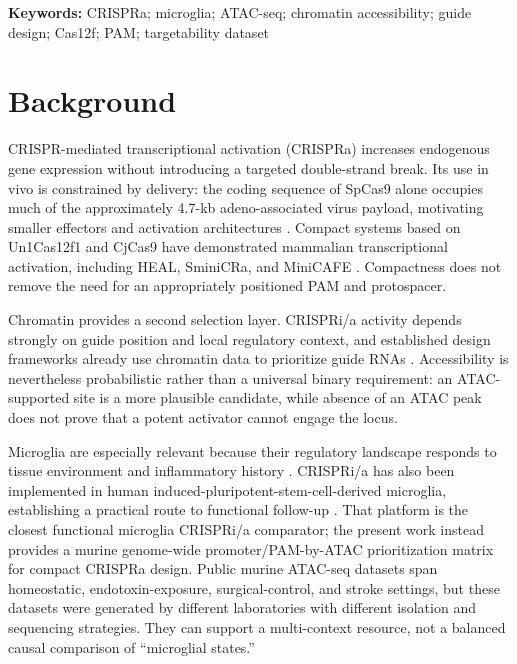 \documentclass[11pt]{article}
\begin{document}
\begin{abstract}
\textbf{Conclusions:} PAM availability was broader than guide-site support in the promoter window studied. The resource provides auditable candidate protospacers and robustness annotations for experimental prioritization, not evidence of CRISPRa efficacy, non-activatability, safety, or therapeutic benefit.
\end{abstract}

\noindent\textbf{Keywords:} CRISPRa; microglia; ATAC-seq; chromatin accessibility; guide design; Cas12f; PAM; targetability dataset

\section{Background}

CRISPR-mediated transcriptional activation (CRISPRa) increases endogenous gene expression without introducing a targeted double-strand break. Its use in vivo is constrained by delivery: the coding sequence of SpCas9 alone occupies much of the approximately 4.7-kb adeno-associated virus payload, motivating smaller effectors and activation architectures \citep{vora2018miniVPR,bohm2020crispra}. Compact systems based on Un1Cas12f1 and CjCas9 have demonstrated mammalian transcriptional activation, including HEAL, SminiCRa, and MiniCAFE \citep{wan2026heal,wang2024sminicra,zhang2021minicafe}. Compactness does not remove the need for an appropriately positioned PAM and protospacer.

Chromatin provides a second selection layer. CRISPRi/a activity depends strongly on guide position and local regulatory context, and established design frameworks already use chromatin data to prioritize guide RNAs \citep{horlbeck2016crispri,sanson2018crispra,crisprverse2022}. Accessibility is nevertheless probabilistic rather than a universal binary requirement: an ATAC-supported site is a more plausible candidate, while absence of an ATAC peak does not prove that a potent activator cannot engage the locus.

Microglia are especially relevant because their regulatory landscape responds to tissue environment and inflammatory history \citep{gosselin2017environment,wendeln2018innate,zhangx2022innate}. CRISPRi/a has also been implemented in human induced-pluripotent-stem-cell-derived microglia, establishing a practical route to functional follow-up \citep{drager2022crispri}. That platform is the closest functional microglia CRISPRi/a comparator; the present work instead provides a murine genome-wide promoter/PAM-by-ATAC prioritization matrix for compact CRISPRa design. Public murine ATAC-seq datasets span homeostatic, endotoxin-exposure, surgical-control, and stroke settings, but these datasets were generated by different laboratories with different isolation and sequencing strategies. They can support a multi-context resource, not a balanced causal comparison of ``microglial states.''
\end{document}
